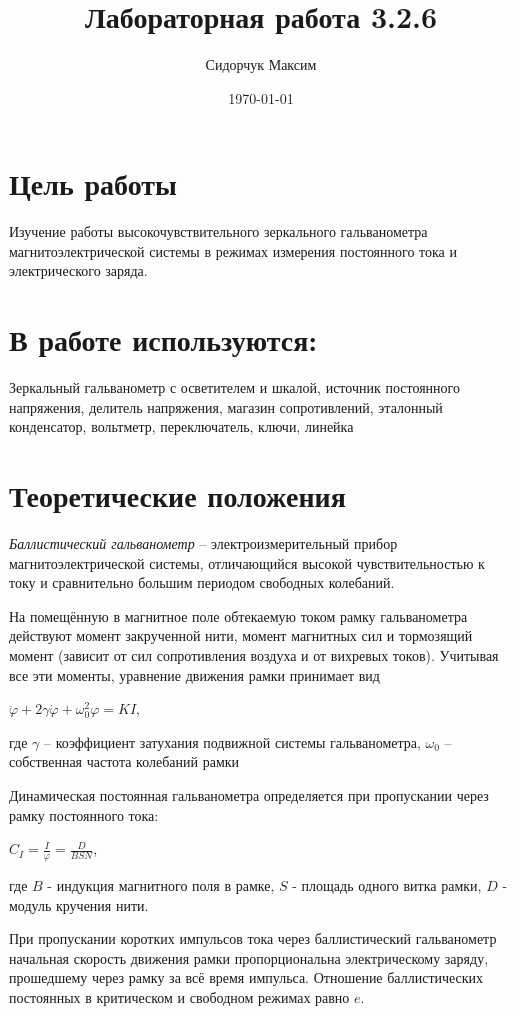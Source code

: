 \documentclass[a4paper]{article}
\date{\today}
\title{Лабораторная работа 3.2.6}
\author{Сидорчук Максим}
\begin{document}
\maketitle

\section{Цель работы}
Изучение работы высокочувствительного зеркального гальванометра магнитоэлектрической системы в режимах измерения постоянного тока и электрического заряда.

\section{В работе используются:}
Зеркальный гальванометр с осветителем и шкалой, источник постоянного напряжения, делитель напряжения, магазин сопротивлений, эталонный конденсатор, вольтметр, переключатель, ключи, линейка

\section{Теоретические положения}

\textit{Баллистический гальванометр} -- электроизмерительный прибор магнитоэлектрической системы, отличающийся высокой чувствительностью к току и сравнительно большим периодом свободных колебаний. \par
На помещённую в магнитное поле обтекаемую током рамку гальванометра действуют момент закрученной нити, момент магнитных сил и тормозящий момент (зависит от сил сопротивления воздуха и от вихревых токов). Учитывая все эти моменты, уравнение движения рамки принимает вид
\begin{center}
    $\ddot \varphi + 2 \gamma \dot \varphi + \omega_0^2\varphi = KI $,
\end{center}
где $\gamma$ -- коэффициент затухания подвижной системы гальванометра, $\omega_0$ -- собственная частота колебаний рамки

Динамическая постоянная гальванометра определяется при пропускании через рамку постоянного тока:
\begin{center}
    $C_I = \frac{I}{\varphi} = \frac{D}{BSN}$,
\end{center}
где $B$ - индукция магнитного поля в рамке, $S$ - площадь одного витка рамки, $D$ - модуль кручения нити. \par
При пропускании коротких импульсов тока через баллистический гальванометр начальная скорость движения рамки пропорциональна электрическому заряду, прошедшему через рамку за всё время импульса. Отношение баллистических постоянных в критическом и свободном режимах равно $e$.
\end{document}
